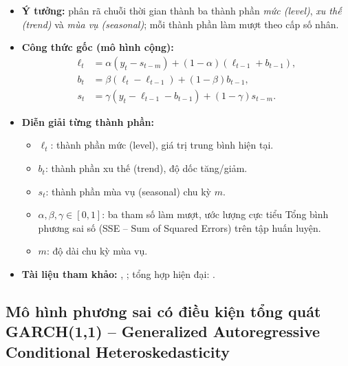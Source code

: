 \documentclass[12pt,a4paper,openany,oneside]{report}
\numberwithin{equation}{chapter}
\begin{document}
\begin{itemize}[leftmargin=18pt,topsep=2pt,itemsep=4pt]
  \item \textbf{Ý tưởng:} phân rã chuỗi thời gian thành ba thành phần
        \emph{mức (level)}, \emph{xu thế (trend)} và \emph{mùa vụ
        (seasonal)}; mỗi thành phần làm mượt theo cấp số nhân.
  \item \textbf{Công thức gốc (mô hình cộng):}
        \begin{align}
          \ell_t &= \alpha (y_t - s_{t-m}) + (1-\alpha)(\ell_{t-1} + b_{t-1}),\\
          b_t    &= \beta (\ell_t - \ell_{t-1}) + (1-\beta) b_{t-1},
                   \label{eq:ets}\\
          s_t    &= \gamma (y_t - \ell_{t-1} - b_{t-1}) + (1-\gamma) s_{t-m}.
        \end{align}
  \item \textbf{Diễn giải từng thành phần:}
        \begin{itemize}[leftmargin=14pt,topsep=2pt,itemsep=1pt]
          \item $\ell_t$: thành phần mức (level), giá trị trung bình hiện tại.
          \item $b_t$: thành phần xu thế (trend), độ dốc tăng/giảm.
          \item $s_t$: thành phần mùa vụ (seasonal) chu kỳ $m$.
          \item $\alpha,\beta,\gamma \in [0,1]$: ba tham số làm mượt,
                ước lượng cực tiểu Tổng bình phương sai số (SSE -- Sum
                of Squared Errors) trên tập huấn luyện.
          \item $m$: độ dài chu kỳ mùa vụ.
        \end{itemize}
  \item \textbf{Tài liệu tham khảo:} \citet{Holt1957}, \citet{Winters1960};
        tổng hợp hiện đại: \citet{HyndmanAthanasopoulos2021}.
\end{itemize}

\subsection{Mô hình phương sai có điều kiện tổng quát GARCH(1,1) -- Generalized Autoregressive Conditional Heteroskedasticity}
\end{document}
